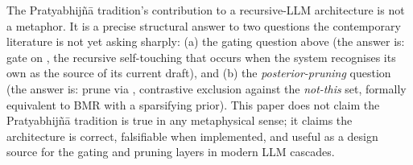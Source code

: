 The Pratyabhij\~n\=a tradition's contribution to a recursive-LLM architecture is not a metaphor. It is a precise structural answer to two questions the contemporary literature is not yet asking sharply: (a) the gating question above (the answer is: gate on , the recursive self-touching that occurs when the system recognises its own  as the source of its current draft), and (b) the \emph{posterior-pruning} question (the answer is: prune via , contrastive exclusion against the \emph{not-this} set, formally equivalent to BMR with a sparsifying prior). This paper does not claim the Pratyabhij\~n\=a tradition is true in any metaphysical sense; it claims the architecture is correct, falsifiable when implemented, and useful as a design source for the gating and pruning layers in modern LLM cascades.

